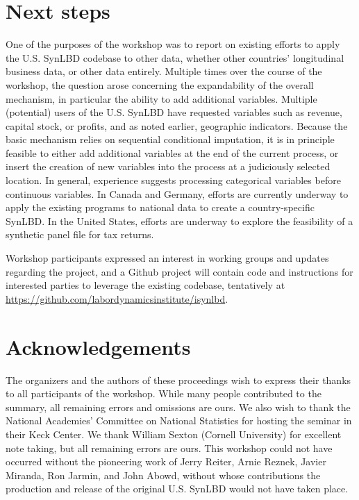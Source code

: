 \documentclass[letterpaper,12pt]{article}
\begin{document}
\section{Next steps}
One of the purposes of the workshop was to report on existing efforts to apply the U.S. SynLBD codebase to other data, whether other countries' longitudinal business data, or other data entirely. Multiple times over the course of the workshop, the question arose concerning the expandability of the overall mechanism, in particular the ability to add additional variables. Multiple (potential) users of the U.S. SynLBD have requested variables such as revenue, capital stock, or profits, and as noted earlier, geographic indicators. Because the basic mechanism relies on sequential conditional imputation, it is in principle feasible to either add additional variables at the end of the current process, or insert the creation of new variables into the process at a judiciously selected location. In general, experience suggests processing categorical variables before continuous variables. 
In Canada and Germany, efforts are currently underway to apply the existing programs to national data to create a country-specific SynLBD. In the United States, efforts are underway to explore the feasibility of a synthetic panel file for tax returns. 


Workshop participants expressed an interest in working groups and updates regarding the project, and a Github project will contain code and instructions for interested parties to leverage the existing codebase, tentatively at \url{https://github.com/labordynamicsinstitute/isynlbd}. 

\section{Acknowledgements}
The organizers and the authors of these proceedings wish to express their thanks to all  participants of the workshop. While many people contributed to the summary, all remaining errors and omissions are ours. We also wish to thank the National Academies' Committee on National Statistics for hosting the seminar in their Keck Center. We thank William Sexton (Cornell University) for excellent note taking, but all remaining errors are ours. This workshop could not have occurred without the pioneering work of Jerry Reiter, Arnie Reznek, Javier Miranda, Ron Jarmin, and John Abowd, without whose contributions the production and release of the original U.S. SynLBD would not have taken place.



\end{document}
